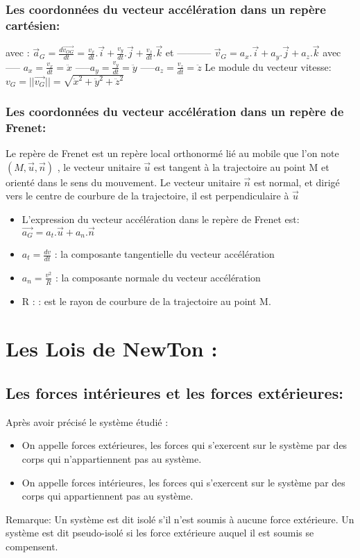 \documentclass[12pt]{article}
\begin{document}
\subsubsection{Les coordonnées du vecteur accélération dans un repère cartésien:}
avec : $\vec{a}_G = \frac{d\vec{v_{OG}}}{dt} = \frac{v_x}{dt}.\vec{i} + \frac{v_y}{dt}.\vec{j} + \frac{v_z}{dt}.\vec{k}$  et -----------  $\vec{v}_G = a_x.\vec{i} + a_y.\vec{j} + a_z.\vec{k}$ avec ----- $a_x = \frac{v_x}{dt} = \ddot{x}$
-----$a_y = \frac{v_y}{dt} = \ddot{y}$
-----$a_z = \frac{v_z}{dt} = \ddot{z}$
Le module du vecteur vitesse: $v_G = ||\vec{v_G}|| = \sqrt{\ddot{x}^2 + \ddot{y}^2 + \ddot{z}^2 }$


\subsubsection{Les coordonnées du vecteur accélération dans un repère de Frenet:}
Le repère de Frenet est un repère local orthonormé lié au mobile que l'on note $(M,\vec{u},\vec{n})$
, le vecteur unitaire $\vec{u}$
est tangent à la trajectoire au point M et orienté dans le sens du mouvement.
Le vecteur unitaire $\vec{n}$
est normal, et dirigé vers le centre de courbure de la trajectoire, il est perpendiculaire à $\vec{u}$

\begin{itemize}
	\item L'expression du vecteur accélération dans le repère de Frenet est: $\vec{a_G} = a_t.\vec{u} + a_n.\vec{n}$

	\item $a_t = \frac{dv}{dt}$ : la composante tangentielle du vecteur accélération
	\item $a_n = \frac{v^2}{R}$ : la composante normale du vecteur accélération
	\item R : : est le rayon de courbure de la trajectoire au point M.
\end{itemize}

\section{Les Lois de NewTon : }
\subsection{Les forces intérieures et les forces extérieures:}
Après avoir précisé le système étudié :
\begin{itemize}
	\item On appelle forces extérieures, les forces qui s'exercent sur le système par des corps qui n'appartiennent pas au système.
	\item On appelle forces intérieures, les forces qui s'exercent sur le système par des corps qui appartiennent pas au système.

\end{itemize}
\begin{tcolorbox}
Remarque: Un système est dit isolé s'il n'est soumis à aucune force extérieure.
Un système est dit pseudo-isolé si les force extérieure auquel il est soumis se compensent.
\end{tcolorbox}
\end{document}
